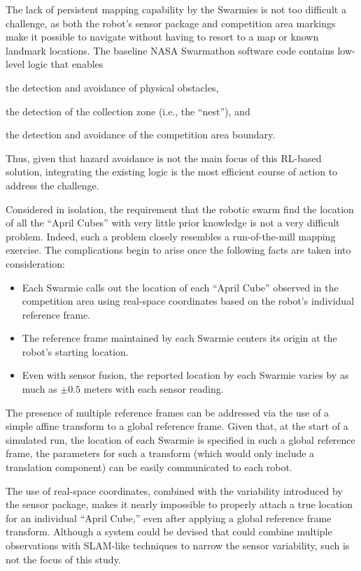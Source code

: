 \documentclass[sigconf,authordraft]{acmart}
\begin{document}
The lack of persistent mapping capability by the Swarmies is not too difficult a challenge, as both the robot's sensor package and competition area markings make it possible to navigate without having to resort to a map or known landmark locations. The baseline NASA Swarmathon software code contains low-level logic that enables
\begin{enumerate*}[label={(\arabic*)}]
  \item the detection and avoidance of physical obstacles,
  \item the detection of the collection zone (i.e., the ``nest''), and
  \item the detection and avoidance of the competition area boundary.
\end{enumerate*}
Thus, given that hazard avoidance is not the main focus of this RL-based solution, integrating the existing logic is the most efficient course of action to address the challenge.

Considered in isolation, the requirement that the robotic swarm find the location of all the ``April Cubes'' with very little prior knowledge is not a very difficult problem. Indeed, such a problem closely resembles a run-of-the-mill mapping exercise. The complications begin to arise once the following facts are taken into consideration:

\begin{itemize}
  \item Each Swarmie calls out the location of each ``April Cube'' observed in the competition area using real-space coordinates based on the robot's individual reference frame.
  \item The reference frame maintained by each Swarmie centers its origin at the robot's starting location.
  \item Even with sensor fusion, the reported location by each Swarmie varies by as much as $\pm 0.5$ meters with each sensor reading.
\end{itemize}

The presence of multiple reference frames can be addressed via the use of a simple affine transform to a global reference frame. Given that, at the start of a simulated run, the location of each Swarmie is specified in such a global reference frame, the parameters for such a transform (which would only include a translation component) can be easily communicated to each robot.

The use of real-space coordinates, combined with the variability introduced by the sensor package, makes it nearly impossible to properly attach a true location for an individual ``April Cube,'' even after applying a global reference frame transform. Although a system could be devised that could combine multiple observations with SLAM-like techniques to narrow the sensor variability, such is not the focus of this study.
\end{document}

